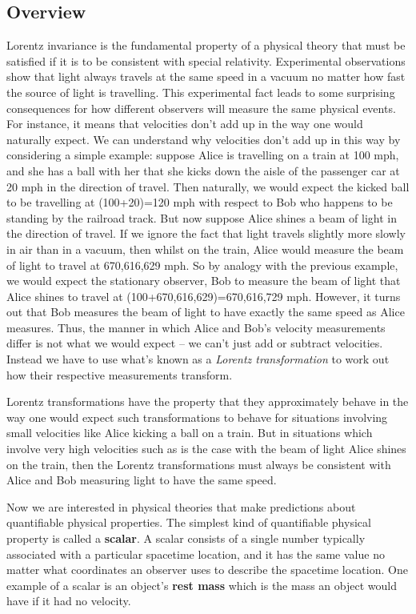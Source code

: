 \documentclass[12pt]{report}
\begin{document}
\subsection{Overview}
Lorentz invariance is the fundamental property of a physical theory that must be satisfied if it is to be consistent with special relativity. Experimental observations show that light always travels at the same speed in a vacuum no matter how fast the source of light is travelling. This experimental fact leads to some surprising consequences for how different observers will measure the same physical events. For instance, it means that velocities don't add up in the way one would naturally expect. We can understand why velocities don't add up in this way by considering a simple example: suppose Alice is travelling on a train at 100 mph, and she has a ball with her that she kicks down the aisle of the passenger car at 20 mph in the direction of travel. Then naturally, we would expect the kicked ball to be travelling at (100+20)=120 mph with respect to Bob who happens to be standing by the railroad track.  But now suppose Alice shines a beam of light in the direction of travel. If we ignore the fact that light travels slightly more slowly in air than in a vacuum, then whilst on the train, Alice would measure the beam of light to travel at 670,616,629 mph. So by analogy with the previous example, we would expect the stationary observer, Bob to measure the beam of light that Alice shines to travel at (100+670,616,629)=670,616,729 mph. However, it turns out that Bob measures the beam of light to have exactly the same speed as Alice measures. Thus, the manner in which Alice and Bob's velocity measurements differ is not what we would expect -- we can't just add or subtract velocities. Instead we have to use what's known as a \emph{Lorentz transformation} to work out how their respective measurements transform.  

Lorentz transformations have the property that they approximately behave in the way one would expect such transformations to behave for situations involving small velocities like Alice kicking a ball on a train. But in situations which involve very high velocities such as is the case with the beam of light Alice shines on the train, then the Lorentz transformations must always be consistent with Alice and Bob measuring light to have the same speed. 

Now we are interested in physical theories that make predictions about quantifiable physical properties. The simplest kind of quantifiable physical property is called a \textbf{scalar}.  A scalar consists of a single number typically associated with a particular spacetime location, and it has the same value no matter what coordinates an observer uses to describe the spacetime location. One example of a scalar is an object's \textbf{rest mass} which is the mass an object would have if it had no velocity. 
\end{document}
